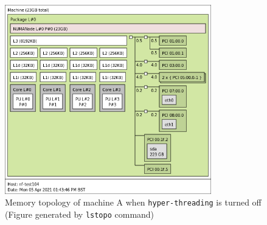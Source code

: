 \documentclass[12pt,a4paper,twoside,openright]{report}
\begin{document}
    \begin{figure}[H]
    \centering
    \includegraphics[width=0.8\textwidth]{figs/memory_topology.png}
    \caption{Memory topology of machine A  when \texttt{hyper-threading} is turned off (Figure generated by \texttt{lstopo} command)}
    \label{fig:memory_topology}
    \end{figure}
\end{document}
